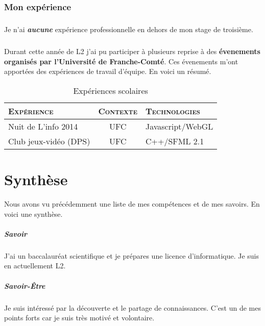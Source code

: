 \documentclass[a4paper,12pt, draft]{report}
\newcommand{\tabTitle}[1]{\hfill{} \textsc{#1} \hfill{} }
\begin{document}
\subsection{Mon expérience}
\paragraph{}
Je n'ai \textit{\textbf{aucune}} expérience professionnelle en dehors de mon stage de troisième.

\paragraph{}
Durant cette année de L2 j'ai pu participer à plusieurs reprise à des \textbf{évenements organisés par l'Université de Franche-Comté}. Ces évenements m'ont apportées des expériences de travail d'équipe. En voici un résumé.

\begin{table}[h]
\begin{tabular}{|l|c|l|}
\hline
\tabTitle{Expérience}  &  \tabTitle{Contexte} & \tabTitle{Technologies}\\
\hline
Nuit de L'info 2014  & UFC & Javascript/WebGL\\
\hline
Club jeux-vidéo (DPS\footnotemark{})  & UFC & C++/SFML 2.1\\
\hline
\end{tabular}
\caption{Expériences scolaires}
\end{table}

\chapter{Synthèse} \label{RefSyntheseBilanPerso}
Nous avons vu précédemment une liste de mes compétences et de mes savoirs.
En voici une synthèse.

\paragraph{Savoir}
J'ai un baccalauréat scientifique et je prépares une licence d'informatique.
Je suis en actuellement L2.

\paragraph{Savoir-Être}
Je suis intéressé par la découverte et le partage de connaissances. C'est un de mes points forts car je suis très motivé et volontaire.
\end{document}
